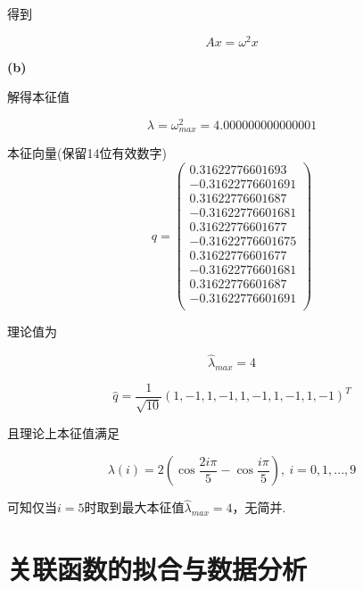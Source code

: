 \documentclass[UTF8]{ctexart}
\begin{document}
得到

\begin{equation}\label{2-a-2}
    Ax=\omega^2x
\end{equation}

\noindent\textbf{(b)}

解得本征值

\begin{equation}\label{2-b-1}
    \lambda=\omega_{max}^2=4.000000000000001
\end{equation}

本征向量(保留14位有效数字)
\begin{equation}\label{2-b-2}
    q=\left(
        \begin{array}{c}
            0.31622776601693 \\
            -0.31622776601691	\\
            0.31622776601687	\\
            -0.31622776601681\\	
            0.31622776601677	\\
            -0.31622776601675	\\
            0.31622776601677	\\
            -0.31622776601681\\	
            0.31622776601687	\\
            -0.31622776601691	\\
        \end{array}
    \right)
\end{equation}

理论值为

\begin{equation}\label{2-b-3}
    \hat{\lambda}_{max}=4
\end{equation}

\begin{equation}\label{2-b-4}
    \hat{q}=\frac{1}{\sqrt{10}}(1,-1,1,-1,1,-1,1,-1,1,-1)^T
\end{equation}

且理论上本征值满足

\begin{equation}\label{2-b-5}
    \lambda(i)=2(\cos\frac{2i\pi}{5}-\cos\frac{i\pi}{5}),\ i=0,1,...,9
\end{equation}

可知仅当$i=5$时取到最大本征值$\hat{\lambda}_{max}=4$，无简并.

\section{关联函数的拟合与数据分析}
\end{document}
